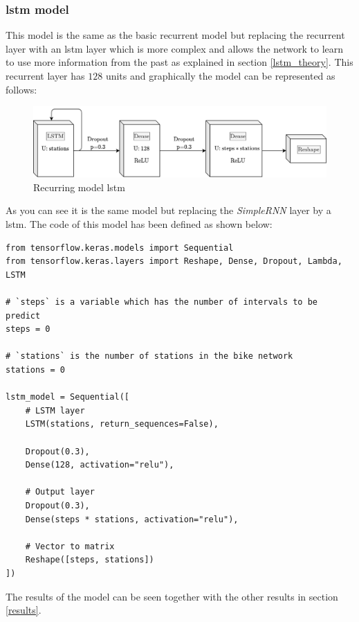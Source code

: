 \subsubsection{\acrshort{lstm} model}

This model is the same as the basic recurrent model but replacing the recurrent layer with an \acrshort{lstm} layer which is more complex and allows the network to learn to use more information from the past as explained in section \ref{lstm_theory}. This recurrent layer has $128$ units and graphically the model can be represented as follows:

\begin{figure}[H]
    \centering
    \includegraphics[width=12cm]{images/solution/models/LSTM.png}
    \caption{Recurring model \acrshort{lstm}}
    \label{fig:dense-model}
\end{figure}

As you can see it is the same model but replacing the \textit{SimpleRNN} layer by a \acrshort{lstm}. The code of this model has been defined as shown below:

\begin{verbatim}
from tensorflow.keras.models import Sequential
from tensorflow.keras.layers import Reshape, Dense, Dropout, Lambda, LSTM

# `steps` is a variable which has the number of intervals to be predict
steps = 0 

# `stations` is the number of stations in the bike network
stations = 0

lstm_model = Sequential([
    # LSTM layer
    LSTM(stations, return_sequences=False),
    
    Dropout(0.3),
    Dense(128, activation="relu"),
    
    # Output layer
    Dropout(0.3),
    Dense(steps * stations, activation="relu"),
    
    # Vector to matrix
    Reshape([steps, stations])
])
\end{verbatim}

The results of the model can be seen together with the other results in section \ref{results}.